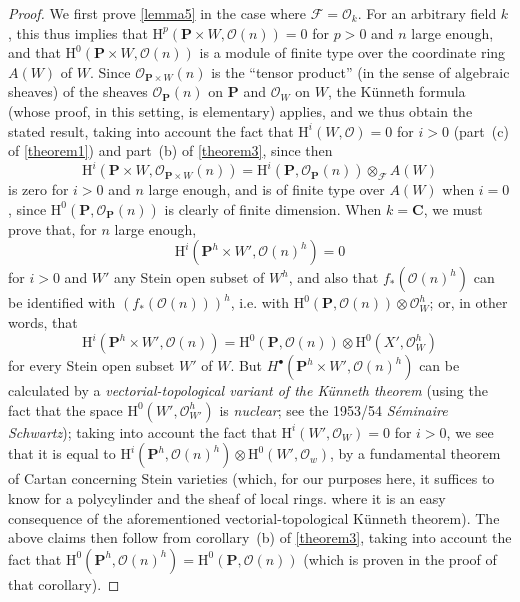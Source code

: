 \documentclass{article}
\theoremstyle{plain}
\theoremstyle{definition}
\newcommand{\sh}{\mathscr}
\newcommand{\HH}{\mathrm{H}}
\newcommand{\oldpage}[1]{\marginpar{\footnotesize$\Big\vert$ \textit{p.~#1}}}
\begin{document}
\begin{proof}
  We first prove \cref{lemma5} in the case where $\sh{F}=\sh{O}_k$.
  For an arbitrary field $k$, this thus implies that $\HH^p(\mathbf{P}\times W,\sh{O}(n))=0$ for $p>0$ and $n$ large enough, and that $\HH^0(\mathbf{P}\times W,\sh{O}(n))$ is a module of finite type over the coordinate ring $A(W)$ of $W$.
  Since $\sh{O}_{\mathbf{P}\times W}(n)$ is the ``tensor product'' (in the sense of algebraic sheaves) of the sheaves $\sh{O}_\mathbf{P}(n)$ on $\mathbf{P}$ and $\sh{O}_W$ on $W$, the Künneth formula (whose proof, in this setting, is elementary) applies, and we thus obtain the stated result, taking into account the fact that $\HH^i(W,\sh{O})=0$ for $i>0$ (part~(c) of \cref{theorem1}) and part~(b) of \cref{theorem3}, since then
  \[
    \HH^i(\mathbf{P}\times W,\sh{O}_{\mathbf{P}\times W}(n))
    = \HH^i(\mathbf{P},\sh{O}_\mathbf{P}(n))\otimes_\sh{F} A(W)
  \]
  is zero for $i>0$ and $n$ large enough, and is of finite type over $A(W)$ when $i=0$, since $\HH^0(\mathbf{P},\sh{O}_\mathbf{P}(n))$ is clearly of finite dimension.
  When $k=\mathbf{C}$, we must prove that, for $n$ large enough, \[\HH^i(\mathbf{P}^h\times W',\sh{O}(n)^h)=0\] for $i>0$ and $W'$ any Stein open subset of $W^h$, and also that $f_*(\sh{O}(n)^h)$ can be identified with $(f_*(\sh{O}(n)))^h$, i.e. with $\HH^0(\mathbf{P},\sh{O}(n))\otimes\sh{O}_W^h$;
  or, in other words, that
  \[
    \HH^i(\mathbf{P}^h\times W',\sh{O}(n))
    = \HH^0(\mathbf{P},\sh{O}(n))\otimes\HH^0(X',\sh{O}_W^h)
  \]
  for every Stein open subset $W'$ of $W$.
  But $H^\bullet(\mathbf{P}^h\times W',\sh{O}(n)^h)$ can be calculated by a \emph{vectorial-topological variant of the Künneth theorem} (using the fact that the space
\oldpage{2-13}
  $\HH^0(W',\sh{O}_{W'}^h)$ is \emph{nuclear};
  see the 1953/54 \emph{Séminaire Schwartz});
  taking into account the fact that $\HH^i(W',\sh{O}_W)=0$ for $i>0$, we see that it is equal to $\HH^i(\mathbf{P}^h,\sh{O}(n)^h)\otimes\HH^0(W',\sh{O}_w)$, by a fundamental theorem of Cartan concerning Stein varieties (which, for our purposes here, it suffices to know for a polycylinder and the sheaf of local rings. where it is an easy consequence of the aforementioned vectorial-topological Künneth theorem).
  The above claims then follow from corollary~(b) of \cref{theorem3}, taking into account the fact that $\HH^0(\mathbf{P}^h,\sh{O}(n)^h)=\HH^0(\mathbf{P},\sh{O}(n))$ (which is proven in the proof of that corollary).


\end{proof}
\end{document}
